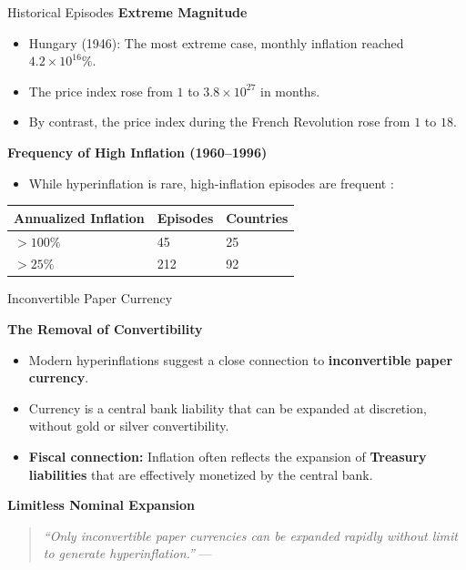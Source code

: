 \documentclass[11pt,aspectratio=169]{beamer}
\begin{document}

\begin{frame}{Historical Episodes}
\small
\textbf{Extreme Magnitude}
\begin{itemize}
    \item Hungary (1946): The most extreme case, monthly inflation reached $4.2 \times 10^{16}\%$.
    \item The price index rose from $1$ to $3.8 \times 10^{27}$ in months.
        \item By contrast, the price index during the French Revolution rose from $1$ to $18$.
\end{itemize}

\vspace{0.2cm}
\textbf{Frequency of High Inflation (1960--1996)}
\begin{itemize}
    \item While hyperinflation is rare, high-inflation episodes are frequent \parencite{fisher2002}:
\end{itemize}

\begin{table}[]
\footnotesize
\centering
\begin{tabular}{@{}lll@{}}
\toprule
\textbf{Annualized Inflation} & \textbf{Episodes} & \textbf{Countries} \\ \midrule
 $> 100\%$ & 45 & 25 \\
 $> 25\%$  & 212 & 92 \\ \bottomrule
\end{tabular}
\end{table}
\end{frame}


\begin{frame}{Inconvertible Paper Currency}
\small

\textbf{The Removal of Convertibility}
\begin{itemize}
    \item Modern hyperinflations suggest a close connection to \textbf{inconvertible paper currency}.
    \item Currency is a central bank liability that can be expanded at discretion, without gold or silver convertibility.
    \item \textbf{Fiscal connection:} Inflation often reflects the expansion of \textbf{Treasury liabilities} that are effectively monetized by the central bank.
\end{itemize}

\vspace{0.3cm}

\textbf{Limitless Nominal Expansion}
\begin{quote}
    \textit{``Only inconvertible paper currencies can be expanded rapidly without limit to generate hyperinflation.''}
    --- \textcite{cagan1989hyper}
\end{quote}
\end{frame}
\end{document}

